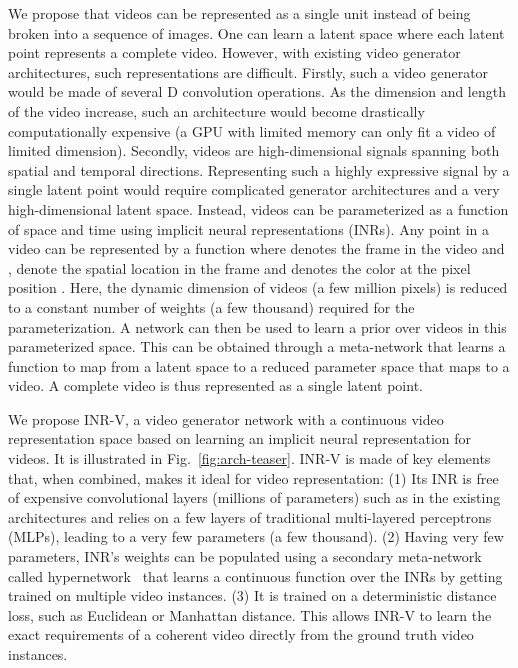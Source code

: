 \documentclass[10pt]{article} \usepackage[accepted]{tmlr}
\begin{document}
We propose that videos can be represented as a single unit instead of being broken into a sequence of images. 
One can learn a latent space where each latent point represents a complete video. 
However, with existing video generator architectures, 
such representations are difficult. Firstly, such a video generator would be made of several D convolution operations. As the dimension and length of the video increase, such an architecture would become drastically computationally expensive (a GPU with limited memory can only fit a video of limited dimension). Secondly, videos are high-dimensional signals spanning both spatial and temporal directions. Representing such a highly expressive signal by a single latent point would require complicated generator architectures and a very high-dimensional latent space. Instead, videos can be parameterized as a function of space and time using implicit neural representations (INRs). Any point in a video  can be represented by a function  where  denotes the  frame in the video and ,  denote the spatial location in the frame and  denotes the color at the pixel position . Here, the dynamic dimension of videos (a few million pixels) is reduced to a constant number of weights  (a few thousand) required for the parameterization. A network can then be used to learn a prior over videos in this parameterized space. This can be obtained through a meta-network that learns a function to map from a latent space to a reduced parameter space that maps to a video. A complete video is thus represented as a single latent point.

We propose INR-V, a video generator network with a continuous video representation space based on learning an implicit neural representation for videos. It is illustrated in Fig.~\ref{fig:arch-teaser}. INR-V is made of key elements that, when combined, makes it ideal for video representation: (1) 
Its INR is free of expensive convolutional layers (millions of parameters) such as in the existing architectures \cite{mocogan-hd, stylegan-v} and relies on a few layers of traditional multi-layered perceptrons (MLPs), leading to a very few parameters (a few thousand).
(2) Having very few parameters, INR's weights can be populated using a secondary meta-network called hypernetwork~\cite{hypernetwork}
that learns a continuous function over the INRs by getting trained on multiple video instances.
(3) It is trained on a deterministic distance loss, such as Euclidean or Manhattan distance. This allows INR-V to learn the exact requirements of a coherent video directly from the ground truth video instances.
\end{document}

